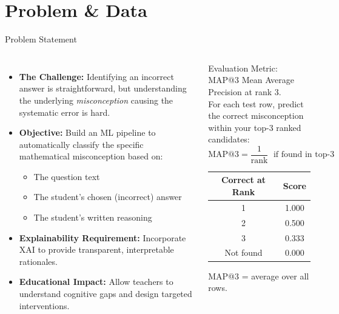 ﻿\documentclass[aspectratio=169,10pt]{beamer}
\begin{document}
\section{Problem \& Data}

\begin{frame}{Problem Statement}
\begin{columns}[T]
\begin{itemize}
  \item \textbf{The Challenge:} Identifying an incorrect answer is straightforward, but understanding the underlying \textit{misconception} causing the systematic error is hard.
  \item \textbf{Objective:} Build an ML pipeline to automatically classify the specific mathematical misconception based on:
  \begin{itemize}
    \item The question text
    \item The student's chosen (incorrect) answer
    \item The student's written reasoning
  \end{itemize}
  \item \textbf{Explainability Requirement:} Incorporate XAI to provide transparent, interpretable rationales.
  \item \textbf{Educational Impact:} Allow teachers to understand cognitive gaps and design targeted interventions.
\end{itemize}
\begin{block}{Evaluation Metric: MAP@3}
Mean Average Precision at rank 3.\\[4pt]
For each test row, predict the correct misconception within your top-3 ranked candidates:
\[
  \text{MAP@3} = \frac{1}{\text{rank}} \;\text{ if found in top-3}
\]
\begin{center}
\begin{tabular}{cc}
\toprule
\textbf{Correct at Rank} & \textbf{Score}\\
\midrule
1 & 1.000\\
2 & 0.500\\
3 & 0.333\\
Not found & 0.000\\
\bottomrule
\end{tabular}
\end{center}
MAP@3 = average over all rows.
\end{block}
\end{columns}
\end{frame}
\end{document}
